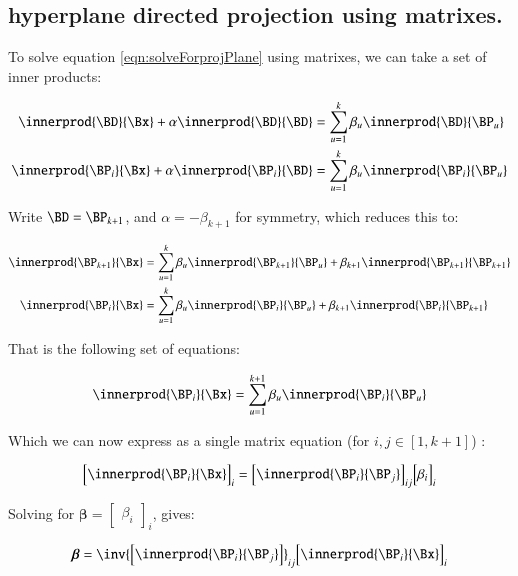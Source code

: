 \documentclass{article}      %
\newcommand{\Bbeta}[0]{\boldsymbol{\beta}}
\begin{document}
\subsection{ hyperplane directed projection using matrixes. }

To solve equation \ref{eqn:solveForprojPlane} using matrixes, we can take a set of inner products:

\begin{align*}
\innerprod{\BD}{\Bx} + \alpha \innerprod{\BD}{\BD} &= \sum_{u=1}^k \beta_u \innerprod{\BD}{\BP_u} \\
\innerprod{\BP_i}{\Bx} + \alpha \innerprod{\BP_i}{\BD} &= \sum_{u=1}^k \beta_u \innerprod{\BP_i}{\BP_u}
\end{align*}

Write $\BD = \BP_{k+1}$, and $\alpha = -\beta_{k+1}$ for symmetry, which reduces this to:

\begin{align*}
\innerprod{\BP_{k+1}}{\Bx} &= \sum_{u=1}^k \beta_u \innerprod{\BP_{k+1}}{\BP_u} + \beta_{k+1} \innerprod{\BP_{k+1}}{\BP_{k+1}}  \\
\innerprod{\BP_i}{\Bx} &= \sum_{u=1}^k \beta_u \innerprod{\BP_i}{\BP_u} + \beta_{k+1} \innerprod{\BP_i}{\BP_{k+1}}
\end{align*}

That is the following set of equations:

\[
\innerprod{\BP_i}{\Bx} = \sum_{u=1}^{k+1} \beta_u \innerprod{\BP_i}{\BP_u}
\]

Which we can now express as a single matrix equation (for $i,j \in [1,k+1]$) :

\begin{equation}
{
\begin{bmatrix}
\innerprod{\BP_i}{\Bx}
\end{bmatrix}
}_i
=
{
\begin{bmatrix}
\innerprod{\BP_i}{\BP_j}
\end{bmatrix}
}_{ij}
{
\begin{bmatrix}
\beta_i
\end{bmatrix}
}_i
\end{equation}

Solving for $\Bbeta = 
{
\begin{bmatrix}
\beta_i
\end{bmatrix}
}_i
$, gives:

\[
\Bbeta = 
\inv{
\begin{bmatrix}
\innerprod{\BP_i}{\BP_j}
\end{bmatrix}
}_{ij}
{
\begin{bmatrix}
\innerprod{\BP_i}{\Bx}
\end{bmatrix}
}_i
\]
\end{document}
